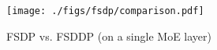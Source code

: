 \begin{figure}[htb]
    \centering

    \texttt{[image: ./figs/fsdp/comparison.pdf]}

    \caption{
        FSDP vs. FSDDP (on a single MoE layer)
    }

    \label{fig:fsdp_vs_fssdp}
\end{figure}
